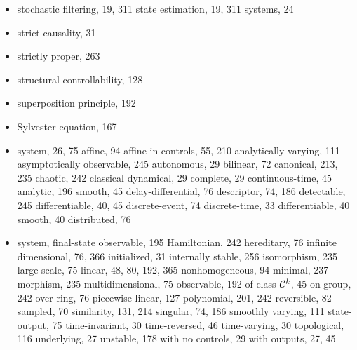 \begin{itemize}
    \subitem error, 20
    \subitem Kalman filter, 315
    \subitem Kalman gain, 315
    \subitem output, 261
  \item stochastic
    \subitem filtering, 19, 311
    \subitem state estimation, 19, 311
    \subitem systems, 24
  \item strict causality, 31
  \item strictly proper, 263
  \item structural controllability, 128
  \item superposition principle, 192
  \item Sylvester equation, 167
  \item system, 26, 75
    \subitem affine, 94
    \subitem affine in controls, 55, 210
    \subitem analytically varying, 111
    \subitem asymptotically observable, 245
    \subitem autonomous, 29
    \subitem bilinear, 72
    \subitem canonical, 213, 235
    \subitem chaotic, 242
    \subitem classical dynamical, 29
    \subitem complete, 29
    \subitem continuous-time, 45
      \subsubitem analytic, 196
      \subsubitem smooth, 45
    \subitem delay-differential, 76
    \subitem descriptor, 74, 186
    \subitem detectable, 245
    \subitem differentiable, 40, 45
    \subitem discrete-event, 74
    \subitem discrete-time, 33
      \subsubitem differentiable, 40
      \subsubitem smooth, 40
    \subitem distributed, 76
\item system,
    \subitem final-state observable, 195
    \subitem Hamiltonian, 242
    \subitem hereditary, 76
    \subitem infinite dimensional, 76, 366
    \subitem initialized, 31
    \subitem internally stable, 256
    \subitem isomorphism, 235
    \subitem large scale, 75
    \subitem linear, 48, 80, 192, 365
      \subsubitem nonhomogeneous, 94
    \subitem minimal, 237
    \subitem morphism, 235
    \subitem multidimensional, 75
    \subitem observable, 192
    \subitem of class ${\cal C}^k$, 45
    \subitem on group, 242
    \subitem over ring, 76
    \subitem piecewise linear, 127
    \subitem polynomial, 201, 242
    \subitem reversible, 82
    \subitem sampled, 70
    \subitem similarity, 131, 214
    \subitem singular, 74, 186
    \subitem smoothly varying, 111
    \subitem state-output, 75
    \subitem time-invariant, 30
    \subitem time-reversed, 46
    \subitem time-varying, 30
    \subitem topological, 116
    \subitem underlying, 27
    \subitem unstable, 178
    \subitem with no controls, 29
    \subitem with outputs, 27, 45

  \indexspace


\end{itemize}
